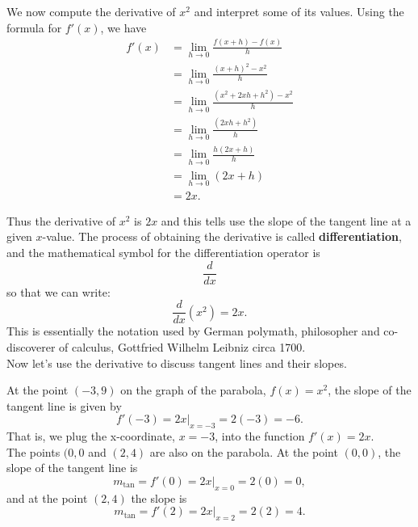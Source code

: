 \documentclass{ximera}
\begin{document}
\begin{example} 
We now compute the derivative of $x^2$ and interpret some of its values.
Using the formula for $f'(x)$, we have
\begin{align*}
f'(x) &= \lim_{h \to 0} \frac{f(x+h)-f(x)}{h}\\[5pt] 
&= \lim_{h \to 0} \frac{(x+h)^2- x^2}{h}\\[5pt] 
&= \lim_{h \to 0} \frac{(x^2 + 2xh + h^2)- x^2}{h} \\[5pt] 
&=  \lim_{h \to 0} \frac{ (2xh + h^2)}{h}\\[5pt] 
&=  \lim_{h \to 0} \frac{ h(2x + h)}{h}\\[5pt] 
&=  \lim_{h \to 0} (2x + h)\\
&= 2x.
\end{align*}

Thus the derivative of $x^2$ is $2x$ and this tells use the slope of the tangent line at a given $x$-value.
The process of obtaining the derivative is called \textbf{differentiation},
and the mathematical symbol for the differentiation operator is
\[
\frac{d}{dx}
\]
so that we can write:
\[
\frac{d}{dx}\left( x^2\right) = 2x.
\]
This is essentially the notation used by German polymath, philosopher and co-discoverer of calculus, 
Gottfried Wilhelm Leibniz circa 1700.\\
Now let's use the derivative to discuss tangent lines and their slopes.

At the point $(-3, 9)$ on the graph of the parabola, $f(x) = x^2$, the slope of the tangent line is given by 
\[
f'(-3) = 2x\big|_{x=-3} = 2(-3) = -6.
\]
That is, we plug the x-coordinate, $x=-3$, into the function $f'(x) = 2x$.\\
The points $(0,0$ and $(2,4)$ are also on the parabola. 
At the point $(0,0)$, the slope of the tangent line is 
\[
m_{\text{tan}}= f'(0) =2x\big|_{x=0}= 2(0) = 0,
\]
 and at the point $(2, 4)$ the slope is 
\[
m_{\text{tan}}= f'(2) =2x\big|_{x=2}= 2(2) = 4.
\]




\end{example}

\end{document}
